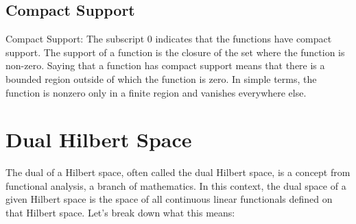 \documentclass[a4paper,12pt]{article} %
\begin{document}
\subsection{Compact Support}
Compact Support: The subscript 0 indicates that the functions have compact support. The support of a function is the closure of the set where the function is non-zero. Saying that a function has compact support means that there is a bounded region outside of which the function is zero. In simple terms, the function is nonzero only in a finite region and vanishes everywhere else.


\section{\textbf{Dual Hilbert Space}}
The dual of a Hilbert space, often called the dual Hilbert space, is a concept from functional analysis, a branch of mathematics. In this context, the dual space of a given Hilbert space is the space of all continuous linear functionals defined on that Hilbert space. Let's break down what this means:
\end{document}
